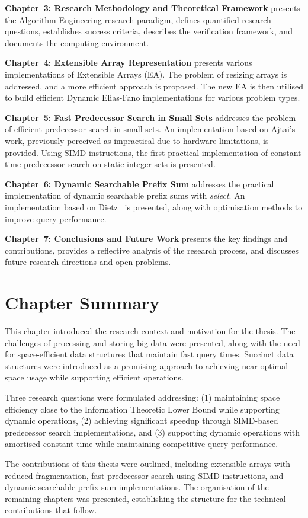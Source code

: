 \textbf{Chapter~3: Research Methodology and Theoretical Framework} presents the Algorithm Engineering research paradigm, defines quantified research questions, establishes success criteria, describes the verification framework, and documents the computing environment.

\textbf{Chapter~4: Extensible Array Representation} presents various implementations of Extensible Arrays (EA). The problem of resizing arrays is addressed, and a more efficient approach is proposed. The new EA is then utilised to build efficient Dynamic Elias-Fano implementations for various problem types.

\textbf{Chapter~5: Fast Predecessor Search in Small Sets} addresses the problem of efficient predecessor search in small sets. An implementation based on Ajtai's~\cite{AJTAI1984217} work, previously perceived as impractical due to hardware limitations, is provided. Using SIMD instructions, the first practical implementation of constant time predecessor search on static integer sets is presented.

\textbf{Chapter~6: Dynamic Searchable Prefix Sum} addresses the practical implementation of dynamic searchable prefix sums with \textit{select}. An implementation based on Dietz~\cite{Dietz_1989} is presented, along with optimisation methods to improve query performance.

\textbf{Chapter~7: Conclusions and Future Work} presents the key findings and contributions, provides a reflective analysis of the research process, and discusses future research directions and open problems.

\section{Chapter Summary}

This chapter introduced the research context and motivation for the thesis. The challenges of processing and storing big data were presented, along with the need for space-efficient data structures that maintain fast query times. Succinct data structures were introduced as a promising approach to achieving near-optimal space usage while supporting efficient operations.

Three research questions were formulated addressing: (1) maintaining space efficiency close to the Information Theoretic Lower Bound while supporting dynamic operations, (2) achieving significant speedup through SIMD-based predecessor search implementations, and (3) supporting dynamic operations with amortised constant time while maintaining competitive query performance.

The contributions of this thesis were outlined, including extensible arrays with reduced fragmentation, fast predecessor search using SIMD instructions, and dynamic searchable prefix sum implementations. The organisation of the remaining chapters was presented, establishing the structure for the technical contributions that follow.
